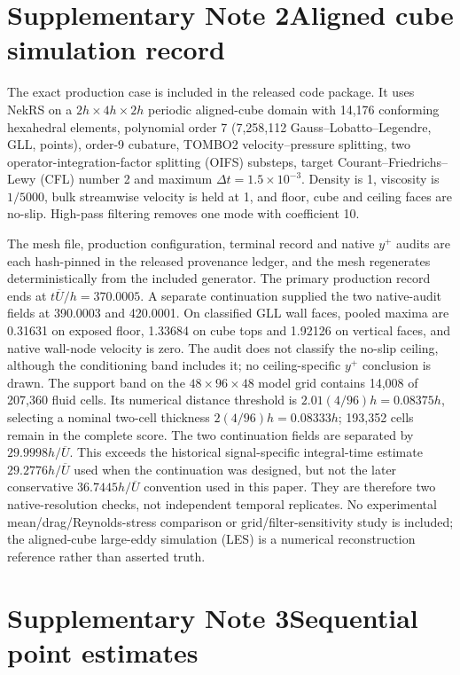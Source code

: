 \documentclass[11pt]{article}
\begin{document}
\section*{Supplementary Note 2\quad Aligned cube simulation record}\label{sec:s-les}

The exact production case is included in the released code package. It uses NekRS on a
$2h\times4h\times2h$ periodic aligned-cube domain with 14,176 conforming hexahedral elements,
polynomial order 7 (7,258,112 Gauss--Lobatto--Legendre, GLL, points), order-9 cubature, TOMBO2 velocity--pressure
splitting, two operator-integration-factor splitting (OIFS) substeps, target
Courant--Friedrichs--Lewy (CFL) number 2 and maximum
$\Delta t=1.5\times10^{-3}$. Density is 1, viscosity is
$1/5000$, bulk streamwise velocity is held at 1, and floor, cube and ceiling faces are no-slip.
High-pass filtering removes one mode with coefficient 10.

The mesh file, production configuration, terminal record and native $y^+$ audits are each
hash-pinned in the released provenance ledger, and the mesh regenerates deterministically from
the included generator. The primary production record ends at $t\overline U/h=370.0005$. A separate continuation supplied
the two native-audit fields at 390.0003 and 420.0001. On classified GLL wall faces, pooled maxima
are 0.31631 on exposed floor, 1.33684 on cube tops and 1.92126 on vertical faces, and native
wall-node velocity is zero. The audit does not classify the no-slip ceiling, although the
conditioning band includes it; no ceiling-specific $y^+$ conclusion is drawn. The support band on
the $48\times96\times48$ model grid contains 14,008 of 207,360 fluid cells. Its numerical distance
threshold is $2.01(4/96)h=0.08375h$, selecting a nominal two-cell thickness
$2(4/96)h=0.08333h$; 193,352 cells remain in the complete score.
The two continuation fields are separated by $29.9998h/\overline U$. This exceeds the historical
signal-specific integral-time estimate $29.2776h/\overline U$ used when the continuation was
designed, but not the later conservative $36.7445h/\overline U$ convention used in this paper.
They are therefore two native-resolution checks, not independent temporal replicates.
No experimental mean/drag/Reynolds-stress comparison or grid/filter-sensitivity study is included;
the aligned-cube large-eddy simulation (LES) is a numerical reconstruction reference rather than asserted truth.

\section*{Supplementary Note 3\quad Sequential point estimates}\label{sec:s-point}
\end{document}
